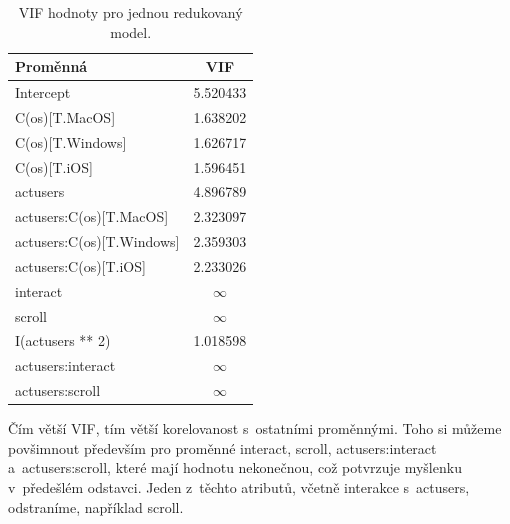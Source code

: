 \documentclass[a4paper, 11pt]{article}
\renewcommand{\texttt}[1]{{\footnotesize\ttfamily #1}}
\begin{document}
\begin{table}
    \centering
    \begin{tabular}{lc}
        \toprule
        \textbf{Proměnná} & \textbf{VIF} \\
        \midrule
        Intercept                  & 5.520433 \\
        C(os)[T.MacOS]             & 1.638202 \\
        C(os)[T.Windows]           & 1.626717 \\
        C(os)[T.iOS]               & 1.596451 \\
        actusers                   & 4.896789 \\
        actusers:C(os)[T.MacOS]    & 2.323097 \\
        actusers:C(os)[T.Windows]  & 2.359303 \\
        actusers:C(os)[T.iOS]      & 2.233026 \\
        interact                   & $\infty$ \\
        scroll                     & $\infty$ \\
        I(actusers ** 2)           & 1.018598 \\
        actusers:interact          & $\infty$ \\
        actusers:scroll            & $\infty$ \\
        \bottomrule
    \end{tabular}
    \caption{VIF hodnoty pro jednou redukovaný model.}
    \label{tab:vif}
\end{table}

Čím větší VIF, tím větší korelovanost s~ostatními proměnnými.
Toho si můžeme povšimnout především pro proměnné \texttt{interact}, \texttt{scroll}, \texttt{actusers:interact} a~\texttt{actusers:scroll}, které mají hodnotu nekonečnou, což potvrzuje myšlenku v~předešlém odstavci.
Jeden z~těchto atributů, včetně interakce s~\texttt{actusers}, odstraníme, například \texttt{scroll}.
\end{document}
